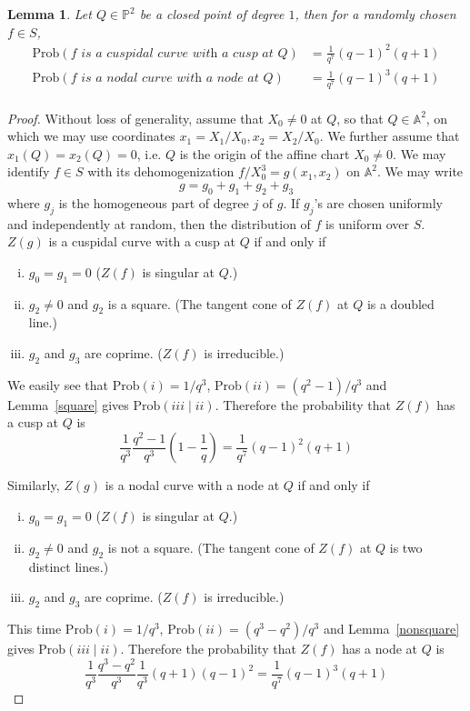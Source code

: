 \documentclass[12pt]{article}
\theoremstyle{plain}
\newtheorem{lemma}[equation]{Lemma}
\theoremstyle{definition}
\newcommand{\IA}{\mathbb{A}}
\newcommand{\IP}{\mathbb{P}}
\newcommand{\<}{\langle}
\renewcommand{\>}{\rangle}
\newcommand{\Prob}{\mathrm{Prob}}
\begin{document}
\begin{lemma}
\label{mainlemma}
Let $Q \in \IP^2$ be a closed point of degree $1$, then for a randomly chosen $f \in S$,
\begin{align*}
\Prob(f \textit{ is a cuspidal curve with a cusp at } Q) &= \frac{1}{q^7}(q - 1)^2(q + 1) \\
\Prob(f \textit{ is a nodal curve with a node at } Q) &= \frac{1}{q^7}(q - 1)^3(q + 1) \\
\end{align*} 
\end{lemma}
\begin{proof}
Without loss of generality, assume that $X_0 \neq 0$ at $Q$, so that $Q \in \IA^2$, on which we may use coordinates $x_1 = X_1/X_0, x_2 = X_2/X_0$. We further assume that $x_1(Q) = x_2(Q) = 0$, i.e. $Q$ is the origin of the affine chart $X_0 \neq 0$. We may identify $f \in S$ with its dehomogenization $f/X_0^3 = g(x_1, x_2)$ on $\IA^2$. We may write 
$$ g = g_0 + g_1 + g_2 + g_3 $$
where $g_j$ is the homogeneous part of degree $j$ of $g$. If $g_j$'s are chosen uniformly and independently at random, then the distribution of $f$ is uniform over $S$. $Z(g)$ is a cuspidal curve with a cusp at $Q$ if and only if 
\begin{enumerate}[i.]
\item $g_0 = g_1 = 0$ ($Z(f)$ is singular at $Q$.) 
\item $g_2 \neq 0$ and $g_2$ is a square. (The tangent cone of $Z(f)$ at $Q$ is a doubled line.)
\item $g_2$ and $g_3$ are coprime. ($Z(f)$ is irreducible.)
\end{enumerate} We easily see that $\Prob(i) = 1/q^3$, $\Prob(ii) = (q^2 - 1)/q^3$ and Lemma~\ref{square} gives $\Prob(iii \mid ii)$. Therefore the probability that $Z(f)$ has a cusp at $Q$ is 
$$ \frac{1}{q^3} \frac{q^2 - 1}{q^3} (1 - \frac{1}{q}) = \frac{1}{q^7}(q - 1)^2(q + 1) $$

Similarly, $Z(g)$ is a nodal curve with a node at $Q$ if and only if 
\begin{enumerate}[i.]
\item $g_0 = g_1 = 0$ ($Z(f)$ is singular at $Q$.) 
\item $g_2 \neq 0$ and $g_2$ is not a square. (The tangent cone of $Z(f)$ at $Q$ is two distinct lines.)
\item $g_2$ and $g_3$ are coprime. ($Z(f)$ is irreducible.)
\end{enumerate}
This time $\Prob(i) = 1/q^3$, $\Prob(ii) = (q^3 - q^2)/q^3$ and Lemma~\ref{nonsquare} gives $\Prob(iii \mid ii)$. Therefore the probability that $Z(f)$ has a node at $Q$ is 
$$ \frac{1}{q^3} \frac{q^3 - q^2}{q^3} \frac{1}{q^3}(q + 1)(q - 1)^2 = \frac{1}{q^7}(q - 1)^3(q + 1) $$
\end{proof}
\end{document}
